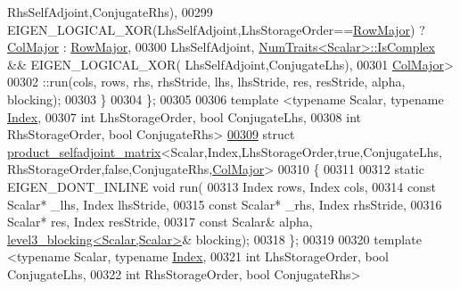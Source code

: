 \begin{DoxyCode}
      RhsSelfAdjoint,ConjugateRhs),
00299       EIGEN\_LOGICAL\_XOR(LhsSelfAdjoint,LhsStorageOrder==\hyperlink{group__enums_ggaacded1a18ae58b0f554751f6cdf9eb13acfcde9cd8677c5f7caf6bd603666aae3}{RowMajor}) ? 
      \hyperlink{group__enums_ggaacded1a18ae58b0f554751f6cdf9eb13a0cbd4bdd0abcfc0224c5fcb5e4f6669a}{ColMajor} : \hyperlink{group__enums_ggaacded1a18ae58b0f554751f6cdf9eb13acfcde9cd8677c5f7caf6bd603666aae3}{RowMajor},
00300       LhsSelfAdjoint, \hyperlink{group___core___module_struct_eigen_1_1_num_traits}{NumTraits<Scalar>::IsComplex} && EIGEN\_LOGICAL\_XOR(
      LhsSelfAdjoint,ConjugateLhs),
00301       \hyperlink{group__enums_ggaacded1a18ae58b0f554751f6cdf9eb13a0cbd4bdd0abcfc0224c5fcb5e4f6669a}{ColMajor}>
00302       ::run(cols, rows,  rhs, rhsStride,  lhs, lhsStride,  res, resStride,  alpha, blocking);
00303   \}
00304 \};
00305 
00306 \textcolor{keyword}{template} <\textcolor{keyword}{typename} Scalar, \textcolor{keyword}{typename} \hyperlink{namespace_eigen_a62e77e0933482dafde8fe197d9a2cfde}{Index},
00307           \textcolor{keywordtype}{int} LhsStorageOrder, \textcolor{keywordtype}{bool} ConjugateLhs,
00308           \textcolor{keywordtype}{int} RhsStorageOrder, \textcolor{keywordtype}{bool} ConjugateRhs>
\hyperlink{struct_eigen_1_1internal_1_1product__selfadjoint__matrix_3_01_scalar_00_01_index_00_01_lhs_storaad3bcb15c8c51e53cb4ff654ee80e230}{00309} \textcolor{keyword}{struct }\hyperlink{struct_eigen_1_1internal_1_1product__selfadjoint__matrix}{product\_selfadjoint\_matrix}<Scalar,Index,LhsStorageOrder,true,ConjugateLhs,
       RhsStorageOrder,false,ConjugateRhs,\hyperlink{group__enums_ggaacded1a18ae58b0f554751f6cdf9eb13a0cbd4bdd0abcfc0224c5fcb5e4f6669a}{ColMajor}>
00310 \{
00311 
00312   \textcolor{keyword}{static} EIGEN\_DONT\_INLINE \textcolor{keywordtype}{void} run(
00313     Index rows, Index cols,
00314     \textcolor{keyword}{const} Scalar* \_lhs, Index lhsStride,
00315     \textcolor{keyword}{const} Scalar* \_rhs, Index rhsStride,
00316     Scalar* res,        Index resStride,
00317     \textcolor{keyword}{const} Scalar& alpha, \hyperlink{class_eigen_1_1internal_1_1level3__blocking}{level3\_blocking<Scalar,Scalar>}& blocking);
00318 \};
00319 
00320 \textcolor{keyword}{template} <\textcolor{keyword}{typename} Scalar, \textcolor{keyword}{typename} \hyperlink{namespace_eigen_a62e77e0933482dafde8fe197d9a2cfde}{Index},
00321           \textcolor{keywordtype}{int} LhsStorageOrder, \textcolor{keywordtype}{bool} ConjugateLhs,
00322           \textcolor{keywordtype}{int} RhsStorageOrder, \textcolor{keywordtype}{bool} ConjugateRhs>

\end{DoxyCode}
